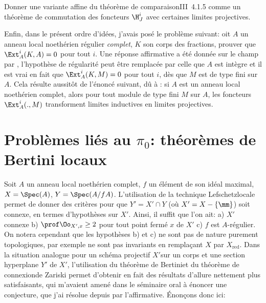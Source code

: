 \begin{probleme} \label{XIII.1.4}
Donner une variante affine du \og th\'eor\`eme de comparaison\fg \textup{\EGA III~4.1.5} comme un th\'eor\`eme de commutation des foncteurs $\H^i_J$ avec certaines limites projectives.
\end{probleme}

Enfin, dans le pr\'esent ordre d'id\'ees, j'avais pos\'e le probl\`eme suivant: oit $A$ un anneau local noeth\'erien r\'egulier \emph{complet}, $K$ son corps des fractions, prouver que $\Ext^i_A(K, A)=0$ pour tout $i$. Une r\'eponse affirmative a \'et\'e donn\'ee sur le champ par , l'hypoth\`ese de r\'egularit\'e peut \^etre remplac\'ee par celle que $A$ est int\`egre et il est vrai en fait que $\Ext^i_A(K, M)=0$ pour tout $i$, d\`es que $M$ est de type fini sur $A$. Cela r\'esulte aussit\^{o}t de l'\'enonc\'e suivant, d\^u \`a : si $A$ est un anneau local noeth\'erien complet, alors pour tout module de type fini $M$ sur $A$, les foncteurs $\Ext_A^i(., M)$ transforment limites inductives en limites projectives.

\section{Probl\`emes li\'es au $\pi_0$: th\'eor\`emes de Bertini locaux} \label{XIII.2}

Soit $A$ un anneau local noeth\'erien complet, $f$ un \'el\'ement de son
id\'eal maximal, $X=\Spec (A)$, $Y=\Spec(A/fA)$. L'utilisation de la
technique \og Lefschetz\fg locale permet de donner des crit\`eres
pour que $Y'=X'\cap Y$ (o\`u $X'=X-\{\mm\}$) soit connexe, en termes
d'hypoth\`eses sur $X'$. Ainsi, il suffit que l'on ait: a) $X'$\pageoriginale
connexe\sisi{}{,} b) $\prof \Oo_{X', x} \ge 2$ pour tout point ferm\'e $x$
de $X'$\sisi{}{,} c) $f$ est $A$-r\'egulier. On notera cependant que les
hypoth\`eses b) et c) ne sont pas de nature purement
topologiques, par exemple ne sont pas invariants en
rempla\c cant $X$ par $X_{\text{red}}$. Dans la situation analogue
pour un sch\'ema projectif $X'$sur un corps et une section
hyperplane $Y'$ de $X'$, l'utilisation du \og th\'eor\`eme de
Bertini\fg et du \og th\'eor\`eme de connexion\fg de Zariski permet
d'obtenir en fait des r\'esultats d'allure nettement plus
satisfaisants, qui m'avaient amen\'e dans le s\'eminaire oral \`a
\'enoncer une conjecture, que j'ai r\'esolue depuis par l'affirmative.
\'Enon\c cons donc ici:

